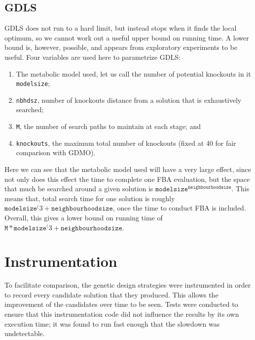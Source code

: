 \subsection{GDLS}
GDLS does not run to a hard limit, but instead stops when it finds the local optimum, so we cannot work out a useful upper bound on running time. 
A lower bound is, however, possible, and appears from exploratory experiments to be useful.
Four variables are used here to parametrize GDLS: 
\begin{enumerate}
\item The metabolic model used, let us call the number of potential knockouts in it \texttt{modelsize};
\item \texttt{nbhdsz}, number of knockouts distance from a solution that is exhaustively searched;
\item \texttt{M}, the number of search paths to maintain at each stage; and
\item \texttt{knockouts}, the maximum total number of knockouts (fixed at 40 for fair comparison with GDMO).
\end{enumerate}
Here we can see that the metabolic model used will have a very large effect, since not only does this effect the time to complete one FBA evaluation, but the space that much be searched around a given solution is \(\texttt{modelsize}^\texttt{neighbourhoodsize}\). This means that, total search time for one solution is roughly \(\texttt{modelsize}^(3+\texttt{neighbourhoodsize}\), once the time to conduct FBA is included. Overall, this gives a lower bound on running time of \(\texttt{M} * \texttt{modelsize} ^ ( 3 + \texttt{neighbourhoodsize}\).

\section{Instrumentation}
To facilitate comparison, the genetic design strategies were instrumented in order to record every candidate solution that they produced. This allows the improvement of the candidates over time to be seen. 
Tests were conducted to ensure that this instrumentation code did not influence the results by its own execution time; it was found to run fast enough that the slowdown was undetectable.

